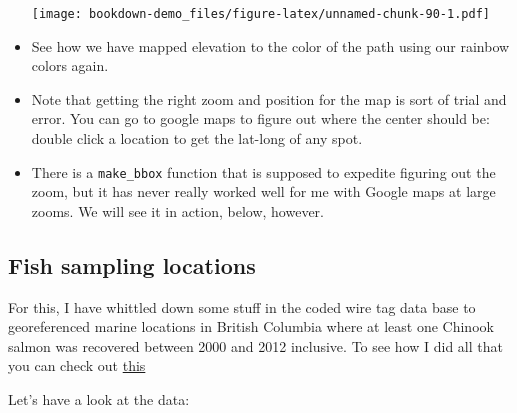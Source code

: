 \documentclass[]{book}
\newenvironment{Shaded}{\begin{snugshade}}{\end{snugshade}}
\newcommand{\KeywordTok}[1]{\textcolor[rgb]{0.13,0.29,0.53}{\textbf{{#1}}}}
\newcommand{\StringTok}[1]{\textcolor[rgb]{0.31,0.60,0.02}{{#1}}}
\newcommand{\CommentTok}[1]{\textcolor[rgb]{0.56,0.35,0.01}{\textit{{#1}}}}
\newcommand{\NormalTok}[1]{{#1}}
\theoremstyle{definition}
\theoremstyle{definition}
\theoremstyle{remark}
\begin{document}
\begin{itemize}
  \texttt{[image: bookdown-demo\_files/figure-latex/unnamed-chunk-90-1.pdf]}
\item
  See how we have mapped elevation to the color of the path using our
  rainbow colors again.
\item
  Note that getting the right zoom and position for the map is sort of
  trial and error. You can go to google maps to figure out where the
  center should be: double click a location to get the lat-long of any
  spot.
\item
  There is a \texttt{make\_bbox} function that is supposed to expedite
  figuring out the zoom, but it has never really worked well for me with
  Google maps at large zooms. We will see it in action, below, however.
\end{itemize}

\subsection{Fish sampling locations}\label{fish-sampling-locations}

For this, I have whittled down some stuff in the coded wire tag data
base to georeferenced marine locations in British Columbia where at
least one Chinook salmon was recovered between 2000 and 2012 inclusive.
To see how I did all that you can check out
\href{https://github.com/eriqande/pbt-feasibility/blob/4ea2fc960f74f66b5ec3a11c107cdc52bfb346dc/Rmd/02-02-explore-recovery-and-catch-sample-data.Rmd\#looking-at-locations-of-location-codes}{this}

Let's have a look at the data:

\begin{Shaded}
\end{Shaded}
\end{document}
